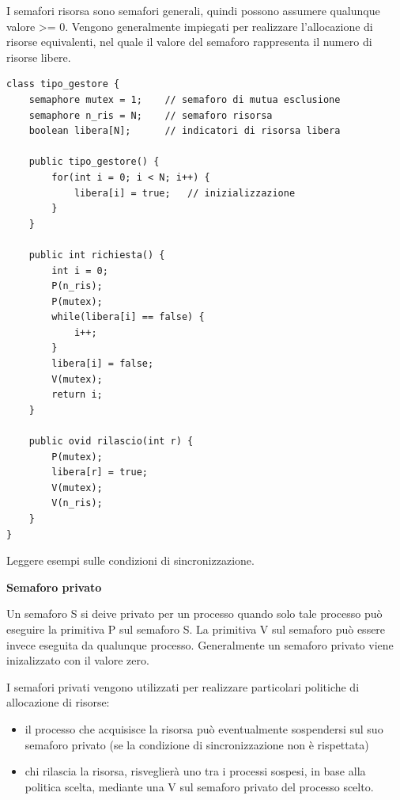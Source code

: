 \documentclass{article}
\begin{document}
\vspace{3mm}
I semafori risorsa sono semafori generali, quindi possono assumere qualunque valore >= 0. Vengono generalmente impiegati per realizzare l'allocazione di risorse
equivalenti, nel quale il valore del semaforo rappresenta il numero di risorse libere.

\vspace{3mm}
\begin{lstlisting}
class tipo_gestore {
    semaphore mutex = 1;    // semaforo di mutua esclusione
    semaphore n_ris = N;    // semaforo risorsa
    boolean libera[N];      // indicatori di risorsa libera

    public tipo_gestore() {
        for(int i = 0; i < N; i++) {
            libera[i] = true;   // inizializzazione
        }
    }

    public int richiesta() {
        int i = 0;
        P(n_ris);
        P(mutex);
        while(libera[i] == false) {
            i++;
        }
        libera[i] = false;
        V(mutex);
        return i;
    }

    public ovid rilascio(int r) {
        P(mutex);
        libera[r] = true;
        V(mutex);
        V(n_ris);
    }
}
\end{lstlisting}

\vspace{3mm}
Leggere esempi sulle condizioni di sincronizzazione.

\vspace{5mm}
\textbf{Semaforo privato}

\vspace{3mm}
Un semaforo S si deive privato per un processo quando solo tale processo può eseguire la primitiva P sul semaforo S. La primitiva V sul semaforo può essere invece eseguita
da qualunque processo. Generalmente un semaforo privato viene inizalizzato con il valore zero.

\vspace{3mm}
I semafori privati vengono utilizzati per realizzare particolari politiche di allocazione di risorse:
\begin{itemize}
    \item il processo che acquisisce la risorsa può eventualmente sospendersi sul suo semaforo privato (se la condizione di sincronizzazione non è rispettata)
    \item chi rilascia la risorsa, risveglierà uno tra i processi sospesi, in base alla politica scelta, mediante una V sul semaforo privato del processo scelto.
\end{itemize}
\end{document}
